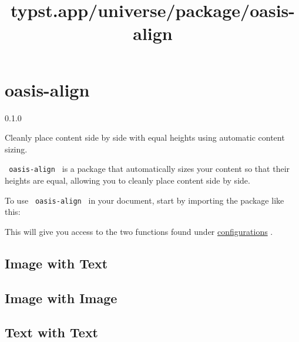\title{typst.app/universe/package/oasis-align}

\label{banner}
\section{oasis-align}\label{oasis-align}

{ 0.1.0 }

Cleanly place content side by side with equal heights using automatic
content sizing.

\label{readme}
\texttt{\ oasis-align\ } is a package that automatically sizes your
content so that their heights are equal, allowing you to cleanly place
content side by side.

To use \texttt{\ oasis-align\ } in your document, start by importing the
package like this:

\begin{Shaded}
\begin{Highlighting}[]
\end{Highlighting}
\end{Shaded}

This will give you access to the two functions found under
\href{https://github.com/typst/packages/raw/main/packages/preview/oasis-align/0.1.0/\#configuration}{configurations}
.

\subsection{Image with Text}\label{image-with-text}


\subsection{Image with Image}\label{image-with-image}


\subsection{Text with Text}\label{text-with-text}

